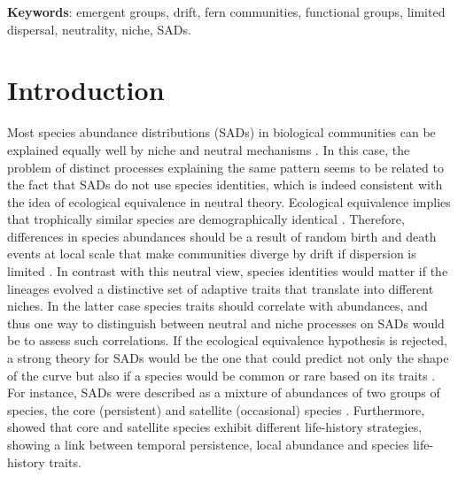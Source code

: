 \documentclass[12pt]{article}
\begin{document}

{\bf Keywords}: emergent groups, drift, fern communities, functional groups, limited dispersal, neutrality, niche, SADs.

\newpage

\section*{Introduction}

Most species abundance distributions (SADs) in biological communities can be explained equally well by niche and neutral mechanisms \citep{McGill2007}. In this case, the problem of distinct processes explaining the same pattern seems to be related to the fact that SADs do not use species identities, which is indeed consistent with the idea of ecological equivalence in neutral theory. Ecological equivalence implies that trophically similar species are demographically identical \citep{Hubbell2001, Hubbell2005}. Therefore, differences in species abundances should be a result of random birth and death events at local scale that make communities diverge by drift if dispersion is limited \citep{Hubbell2001, Hubbell2005}. 
In contrast with this neutral view, species identities would matter if the lineages evolved a distinctive set of adaptive traits that translate into different niches. In the latter case species traits should correlate with abundances, and thus one way to distinguish between neutral and niche processes on SADs would be to assess such correlations. 
If the ecological equivalence hypothesis is rejected, a strong theory for SADs would be the one that could predict not only the shape of the curve but also if a species would be common or rare based on its traits \citep{Mcgill2003}.
For instance, SADs were described as a mixture of abundances of two groups of species, the core (persistent) and satellite (occasional) species \citep{Magurran2003}. Furthermore, \cite{Supp2015} showed that core and satellite species exhibit different life-history strategies, showing a link between temporal persistence, local abundance and species life-history traits.
\end{document}
